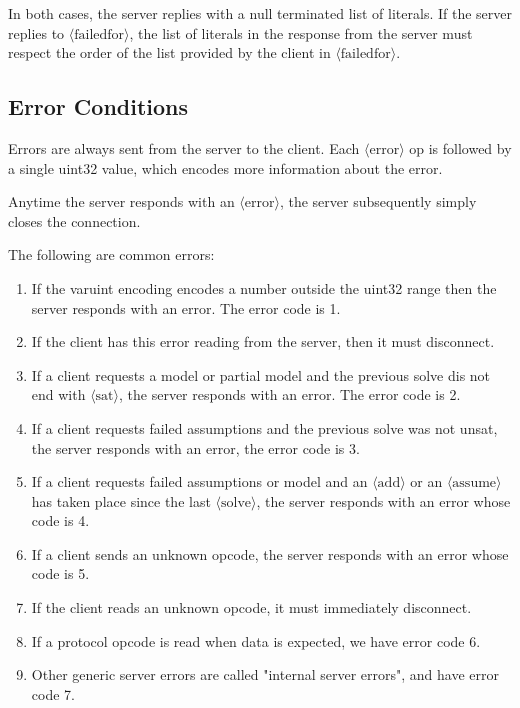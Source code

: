 \documentclass{article}
\newcommand\proto[1]{$\langle\mbox{#1}\rangle$}
\begin{document}
In both cases, the server replies with a null terminated list of literals.
If the server replies to \proto{failedfor}, the list of literals in the response
from the server must respect the order of the list provided by the client
in \proto{failedfor}.

\subsection{Error Conditions}

Errors are always sent from the server to the client.  Each \proto{error} op
is followed by a single uint32 value, which encodes more information
about the error.

Anytime the server responds with an \proto{error}, the server subsequently
simply closes the connection.

The following are common errors:
\begin{enumerate}
	\item If the varuint encoding encodes a number outside the uint32 range
then the server responds with an error.  The error code is 1.

\item If the client has this error reading from the server, then it must disconnect.

\item If a client requests a model or partial model and the previous solve dis
not end with \proto{sat}, the server responds with an error.  The error code is 2.

\item If a client requests failed assumptions and the previous solve was not unsat, the
server responds with an error, the error code is 3.

\item If a client requests failed assumptions or model and an \proto{add} or an \proto{assume}
has taken place since the last \proto{solve}, the server responds with an error
whose code is 4.

\item If a client sends an unknown opcode, the server responds with an error
	whose code is 5.  

\item If the client reads an unknown opcode, it must immediately disconnect.

\item If a protocol opcode is read when data is expected, we have error code 6.

\item Other generic server errors are called "internal server errors", and have
error code 7.
\end{enumerate}
\end{document}
